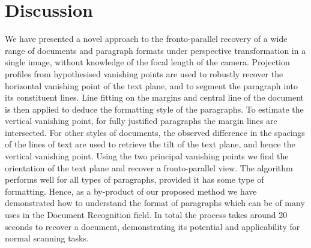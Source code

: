 \documentclass{elsart}   %
\begin{document}
\section{Discussion} \label{conclusions}

We have presented a novel approach to the fronto-parallel recovery of a wide
range of documents and paragraph formats under perspective transformation in a
single image, without knowledge of the focal length of the camera.  Projection
profiles from hypothesised vanishing points are used to robustly recover the
horizontal vanishing point of the text plane, and to segment the paragraph into
its constituent lines.  Line fitting on the margins and central line of the
document is then applied to deduce the formatting style of the paragraphs.  To
estimate the vertical vanishing point, for fully justified paragraphs the margin
lines are intersected.  For other styles of documents, the observed difference
in the spacings of the lines of text are used to retrieve the tilt of the text
plane, and hence the vertical vanishing point.  Using the two principal
vanishing points we find the orientation of the text plane and recover a
fronto-parallel view.  The algorithm performs well for all types of paragraphs,
provided it has some type of formatting. Hence, as a by-product of our proposed
method we have demonstrated how to understand the format of paragraphs which can 
be of many uses in the Document Recognition field.
In total the process takes around 20 seconds to recover a document,
demonstrating its potential and applicability 
for normal scanning tasks.

\end{document}
